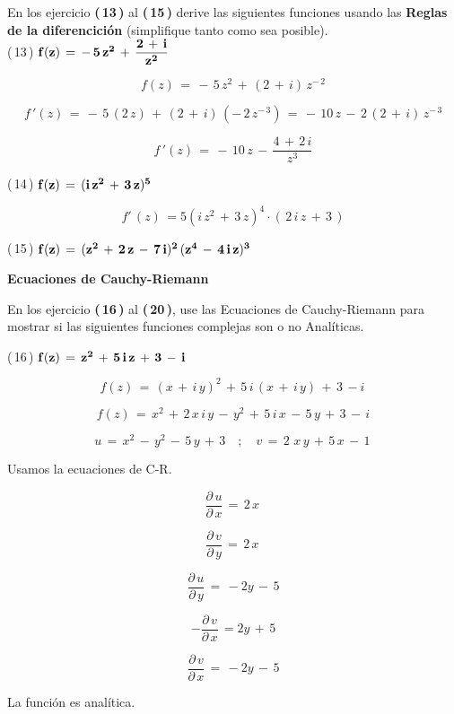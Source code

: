 \documentclass[a4paper,11pt,openany]{book}
\begin{document}
En los ejercicio \textbf{(\,13\,)} al \textbf{(\,15\,)} derive las siguientes funciones usando las \textbf{Reglas de la diferencición} (simplifique tanto como sea posible).\\

\textcolor{ao(english)}{(\,13\,)} $\bf{f(z)\,=\,-\,5\,z^{2}\,+\,\dfrac{2\,+\,i}{z^{2}}}$

$$f(z)\,=\,-\,5\,z^{2}\,+\,(2\,+\,i)\,z^{-\,2}$$

$$f\,'(z)\,=\,-\,5\,(2\,z)\,+\,(2\,+\,i)\,(-\,2\,z^{-\,3})\,=\,-\,10\,z\,-\,2\,(2\,+\,i)\,z^{-\,3}$$

$$f\,'(z)\,=\,-\,10\,z\,-\,\dfrac{4\,+\,2\,i}{z^{3}}$$

\textcolor{ao(english)}{(\,14\,)} $\bf{f(z)\,=\,(i\,z^{2}\,+\,3\,z)^{5}}$

$$ \boxed{f'\,(z)\,= 5(i\,z^{2}\,+\,3\,z)^{4} \cdot (\,2\,i\,z\,+\,3\,)} $$

\textcolor{ao(english)}{(\,15\,)} $\bf{f(z)\,=\,(z^{2}\,+\,2\,z\,-\,7\,i)^{2}\,(z^{4}\,-\,4\,i\,z)^{3}}$

\begin{center}
\textbf{Ecuaciones de Cauchy-Riemann}
\end{center}

En los ejercicio \textbf{(\,16\,)} al \textbf{(\,20\,)}, use las Ecuaciones de Cauchy-Riemann para mostrar si las siguientes funciones complejas son o no Analíticas.

\textcolor{ao(english)}{(\,16\,)} $\bf{f(z)\,=\,z^{2}\,+\,5\,i\,z\,+\,3\,-\,i}$

$$f(z)\,=\,(x\,+\,i\,y)^{2}\,+\,5\,i\,(x\,+\,i\,y)\,+\,3\,-i\,$$  

$$f(z)\,= \,x^{2}\,+\,2\,x\,i\,y\,-\,y^{2}\,+\,5\,i\,x\,-\,5\,y\,+\,3\,-\,i$$

$$u\,=\,x^{2}\,-\,y^{2}\,-\,5\,y\,+\,3 \quad;\quad v\,=\,2\,\,x\,y\,+\,5\,x\,-\,1\,$$

\textcolor{ao(english)}{} Usamos la ecuaciones de C-R.

$$\dfrac{\partial\,u}{\partial\,x}\,=\,2\,x\,$$

$$\dfrac{\partial\,v}{\partial\,y}\,=\,2\,x\,$$

$$\dfrac{\partial\,u}{\partial\,y}\,=\,-2y\,-\,5$$

$$-\dfrac{\partial\,v}{\partial\,x}\,=2y\,+\,5$$

$$\dfrac{\partial\,v}{\partial\,x}\,=\,-2y\,-\,5$$

La función es analítica.\\
\end{document}
